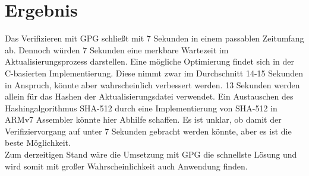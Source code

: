 \documentclass[thesis=bachelor,faculty=cb]{hsmw-thesis}
\begin{document}
{\section{Ergebnis}
Das Verifizieren mit GPG schließt mit 7 Sekunden in einem passablen Zeitumfang ab. Dennoch würden 7 Sekunden eine merkbare Wartezeit im Aktualisierungsprozess darstellen. Eine mögliche Optimierung findet sich in der C-basierten Implementierung. Diese nimmt zwar im Durchschnitt 14-15 Sekunden in Anspruch, könnte aber wahrscheinlich verbessert werden. 13 Sekunden werden allein für das Hashen der Aktualisierungsdatei verwendet. Ein Austauschen des Hashingalgorithmus SHA-512 durch eine Implementierung von SHA-512 in ARMv7 Assembler könnte hier Abhilfe schaffen. Es ist unklar, ob damit der Verifiziervorgang auf unter 7 Sekunden gebracht werden könnte, aber es ist die beste Möglichkeit.
\\[1cm]
Zum derzeitigen Stand wäre die Umsetzung mit GPG die schnellste Lösung und wird somit mit großer Wahrscheinlichkeit auch Anwendung finden.
}
\end{document}
